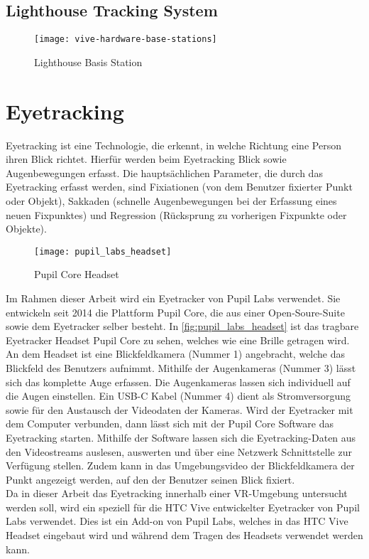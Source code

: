 \subsection{Lighthouse Tracking System}
\begin{figure}[!htbp]
	\centering
	\texttt{[image: vive-hardware-base-stations]}
	\caption[Lighthouse Basis Station]{Lighthouse Basis Station \cite{ViveBaseStation}}
	\label{fig:vive-hardware-base-stations}
\end{figure}

\section{Eyetracking}
Eyetracking ist eine Technologie, die erkennt, in welche Richtung eine Person ihren Blick richtet. Hierfür werden beim Eyetracking Blick sowie Augenbewegungen erfasst. Die hauptsächlichen Parameter, die durch das Eyetracking erfasst werden, sind Fixiationen (von dem Benutzer fixierter Punkt oder Objekt), Sakkaden (schnelle Augenbewegungen bei der Erfassung eines neuen Fixpunktes) und Regression (Rücksprung zu vorherigen Fixpunkte oder Objekte).

\begin{figure}[!htbp]
	\centering
	\texttt{[image: pupil\_labs\_headset]}
	\caption[Pupil Core Headset]{Pupil Core Headset}
	\label{fig:pupil_labs_headset}
\end{figure}


Im Rahmen dieser Arbeit wird ein Eyetracker von Pupil Labs verwendet. Sie entwickeln seit 2014 die Plattform Pupil Core, die aus einer Open-Soure-Suite sowie dem Eyetracker selber besteht. In \autoref{fig:pupil_labs_headset} ist das tragbare Eyetracker Headset Pupil Core zu sehen, welches wie eine Brille getragen wird. An dem Headset ist eine Blickfeldkamera (Nummer 1) angebracht, welche das Blickfeld des Benutzers aufnimmt. Mithilfe der Augenkameras (Nummer 3) lässt sich das komplette Auge erfassen. Die Augenkameras lassen sich individuell auf die Augen einstellen. Ein USB-C Kabel (Nummer 4) dient als Stromversorgung sowie für den Austausch der Videodaten der Kameras. Wird der Eyetracker mit dem Computer verbunden, dann lässt sich mit der Pupil Core Software das Eyetracking starten. Mithilfe der Software lassen sich die Eyetracking-Daten aus den Videostreams auslesen, auswerten und über eine Netzwerk Schnittstelle zur Verfügung stellen. Zudem kann in das Umgebungsvideo der Blickfeldkamera der Punkt angezeigt werden, auf den der Benutzer seinen Blick fixiert. \\
Da in dieser Arbeit das Eyetracking innerhalb einer \ac{VR}-Umgebung untersucht werden soll, wird ein speziell für die HTC Vive entwickelter Eyetracker von Pupil Labs verwendet. Dies ist ein Add-on von Pupil Labs, welches in das HTC Vive Headset eingebaut wird und während dem Tragen des Headsets verwendet werden kann.

